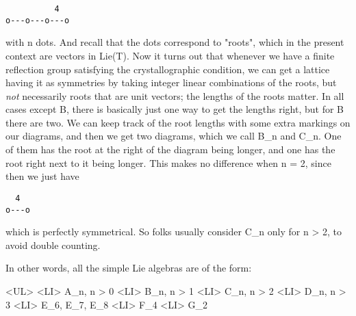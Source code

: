 \begin{verbatim}
          4
o---o---o---o
\end{verbatim}
    

with n dots.  And recall that the dots correspond to
"roots", which in the present context are vectors in Lie(T).
Now it turns out that whenever we have a finite reflection group
satisfying the crystallographic condition, we can get a lattice having
it as symmetries by taking integer linear combinations of the roots,
but \emph{not} necessarily roots that are unit vectors; the lengths
of the roots matter.  In all cases except B, there is basically just
one way to get the lengths right, but for B there are two.  We can
keep track of the root lengths with some extra markings on our
diagrams, and then we get two diagrams, which we call B_{n}
and C_{n}.  One of them has the root at the right of the
diagram being longer, and one has the root right next to it being
longer.  This makes no difference when n = 2, since then we just have

\begin{verbatim}
  4
o---o
\end{verbatim}
    

which is perfectly symmetrical.  So folks usually consider C_{n}
only for n > 2, to avoid double counting.  

In other words, all the simple Lie algebras are of the form:

<UL>
<LI>
A_{n}, n > 0
<LI>
B_{n}, n > 1
<LI>
C_{n}, n > 2
<LI>
D_{n}, n > 3
<LI>
E_{6}, E_{7}, E_{8}
<LI>
F_{4}
<LI>
G_{2}


